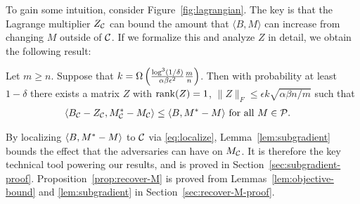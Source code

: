 
To gain some intuition, consider 
Figure~\ref{fig:lagrangian}. The key is that the Lagrange 
multiplier $Z_{\mathcal{C}}$ can bound the amount that $\langle B, M \rangle$ 
can increase from changing $M$ outside of $\mathcal{C}$.
If we formalize this and analyze $Z$ in detail, we obtain the 
following result:
\begin{lemma}
\label{lem:subgradient}
Let $m \geq n$. Suppose that $k = \Omega\left( \frac{\log^3(1/\delta)}{\alpha\beta\epsilon^2}\frac{m}{n} \right)$. 
Then with probability at least $1-\delta$ there exists a matrix $Z$ with 
$\operatorname{rank}(Z) = 1$, $\|Z\|_F \leq \epsilon k\sqrt{\alpha\beta n/m}$ such that
\begin{align}
\label{eq:localize}
\langle B_{\mathcal{C}} - Z_{\mathcal{C}}, M^*_{\mathcal{C}} - M_{\mathcal{C}} \rangle &\leq \langle B, M^* - M \rangle \text{ for all $M \in \mathcal{P}$}.
\end{align}
\end{lemma}
By localizing $\langle B, M^* - M \rangle$ to $\mathcal{C}$ via 
\eqref{eq:localize}, 
Lemma~\ref{lem:subgradient} bounds the effect that the adversaries can have 
on $M_{\mathcal{C}}$. It is therefore the key 
technical tool powering our results, and is proved in 
Section~\ref{sec:subgradient-proof}. Proposition~\ref{prop:recover-M} 
is proved from Lemmas~\ref{lem:objective-bound} and \ref{lem:subgradient} 
in Section~\ref{sec:recover-M-proof}.

